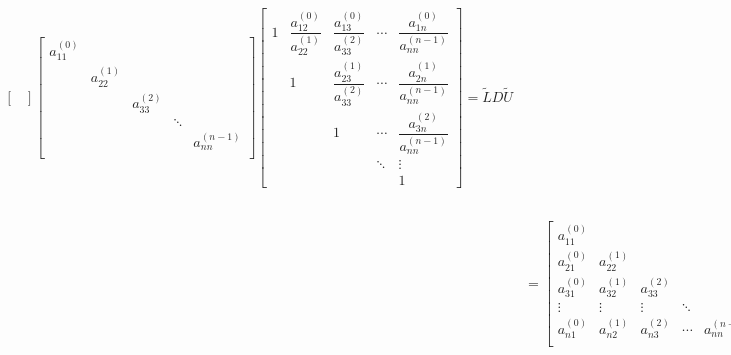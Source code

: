 \documentclass[UTF8,a4paper,10pt]{ctexart}
\begin{document}
\begin{align*}
\begin{bmatrix}
                        \end{bmatrix}
                        \begin{bmatrix}
                            a_{11}^{(0)} & \  & \  & \  &  \  \\
                            \  & a_{22}^{(1)}  & \  & \  &  \  \\
                            \  & \  & a_{33}^{(2)} & \  &  \  \\
                            \  & \  & \  & \ddots & \ \\
                            \  & \  & \  & \  & a_{nn}^{(n-1)} \\
                        \end{bmatrix}
                        \begin{bmatrix}
                            1 & \dfrac{a_{12}^{(0)}}{a_{22}^{(1)}} & \dfrac{a_{13}^{(0)}}{a_{33}^{(2)}} & \cdots & \dfrac{a_{1n}^{(0)}}{a_{nn}^{(n-1)}} \\
                            \ & 1 & \dfrac{a_{23}^{(1)}}{a_{33}^{(2)}} & \cdots & \dfrac{a_{2n}^{(1)}}{a_{nn}^{(n-1)}} \\
                            \ & \ & 1 & \cdots & \dfrac{a_{3n}^{(2)}}{a_{nn}^{(n-1)}} \\
                            \ & \ & \ & \ddots & \vdots \\
                            \ & \ & \ & \ & 1
                        \end{bmatrix}
                        =\tilde{L}D\tilde{U}\\
                        &=
                        \begin{bmatrix}
                            a_{11}^{(0)} & \  & \  & \  & \  & \  \\
                            a_{21}^{(0)} & a_{22}^{(1)} & \  & \  & \  & \  \\
                            a_{31}^{(0)} & a_{32}^{(1)} & a_{33}^{(2)} & \  & \  & \  \\
                            \vdots & \vdots & \vdots  & \ddots & \ \\
                            a_{n1}^{(0)} & a_{n2}^{(1)} & a_{n3}^{(2)} & \cdots & a_{nn}^{(n-1)} \\
                        \end{bmatrix}
                        \begin{bmatrix}
                            1 & \dfrac{a_{12}^{(0)}}{a_{22}^{(1)}} & \dfrac{a_{13}^{(0)}}{a_{33}^{(2)}} & \cdots & \dfrac{a_{1n}^{(0)}}{a_{nn}^{(n-1)}} \\
                            \ & 1 & \dfrac{a_{23}^{(1)}}{a_{33}^{(2)}} & \cdots & \dfrac{a_{2n}^{(1)}}{a_{nn}^{(n-1)}} \\
                            \ & \ & 1 & \cdots & \dfrac{a_{3n}^{(2)}}{a_{nn}^{(n-1)}} \\
                            \ & \ & \ & \ddots & \vdots \\
                            \ & \ & \ & \ & 1
                        \end{bmatrix}
                        =L'U'
                    \end{align*}
\end{document}
